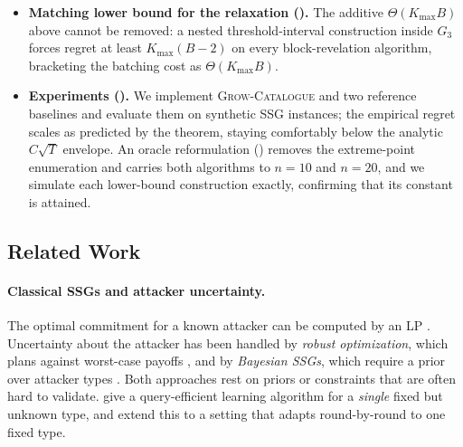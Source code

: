 \documentclass[letterpaper,9pt,twocolumn]{extarticle}
\newcommand{\Kmax}{K_{\max}}
\theoremstyle{plain}
\theoremstyle{definition}
\theoremstyle{remark}
\begin{document}
\begin{itemize}[leftmargin=1.1em,itemsep=0.10em,topsep=0.2em]
    We formalize in  the weakest supplement that repairs
    the impossibility, every $B$ rounds an oracle reports the \emph{set}
    of types seen so far, and nothing about when or how often they attacked
   , give  for it, and prove in  a regret
    bound of $O(n\Kmax^{4/3}T^{2/3}\log^{1/3}(n\Kmax)+\Kmax B)$. By
     the report need arrive only $\tilde O(T^{1/3})$ times over
    the horizon, and not fewer.
  \item \textbf{Matching lower bound for the relaxation
    ().}
    The additive $\Theta(\Kmax B)$ above cannot be removed: a nested
    threshold-interval construction inside $G_3$ forces regret at least
    $\Kmax(B-2)$ on every block-revelation algorithm, bracketing the
    batching cost as $\Theta(\Kmax B)$.
  \item \textbf{Experiments ().}
    We implement \textsc{Grow-Catalogue} and two reference baselines and
    evaluate them on synthetic SSG instances; the empirical regret scales
    as predicted by the theorem, staying comfortably below the analytic
    $C\sqrt{T}$ envelope. An oracle reformulation ()
    removes the extreme-point enumeration and carries both algorithms to
    $n=10$ and $n=20$, and we simulate each lower-bound construction
    exactly, confirming that its constant is attained.
\end{itemize}

\subsection{Related Work}
\label{sec:related}

\paragraph{Classical SSGs and attacker uncertainty.}
The optimal commitment for a known attacker can be computed by an LP
\citep{conitzer2006}. Uncertainty about the attacker has been handled by
\emph{robust optimization}, which plans against worst-case payoffs
\citep{pita2010}, and by \emph{Bayesian SSGs}, which require a prior over
attacker types \citep{kiekintveld2011,marecki2012}. Both approaches rest on
priors or constraints that are often hard to validate. \citet{letchford2009}
give a query-efficient learning algorithm for a \emph{single} fixed but
unknown type, and \citet{blum2014b} extend this to a setting that adapts
round-by-round to one fixed type.
\end{document}
